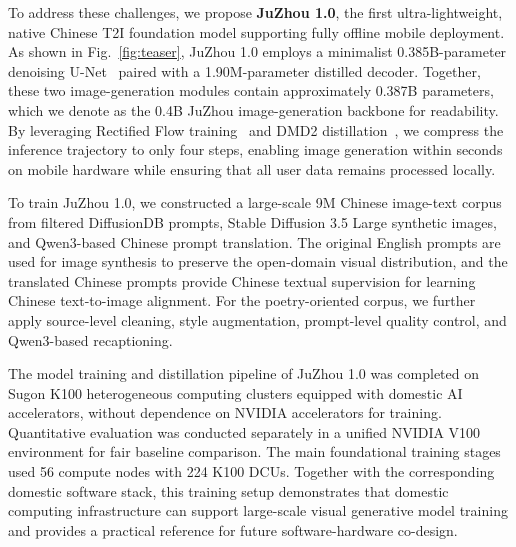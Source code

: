 To address these challenges, we propose \textbf{JuZhou 1.0}, the first ultra-lightweight, native Chinese T2I foundation model supporting fully offline mobile deployment. 
As shown in Fig.~\ref{fig:teaser}, JuZhou 1.0 employs a minimalist 0.385B-parameter denoising U-Net~\cite{ho2020ddpm, rombach2022high} paired with a 1.90M-parameter distilled decoder. Together, these two image-generation modules contain approximately 0.387B parameters, which we denote as the 0.4B JuZhou image-generation backbone for readability.
By leveraging Rectified Flow training~\cite{liu2022flow} and DMD2 distillation~\cite{yin2024improved_dmd}, we compress the inference trajectory to only four steps, enabling image generation within seconds on mobile hardware while ensuring that all user data remains processed locally.

To train JuZhou 1.0, we constructed a large-scale 9M Chinese image-text corpus from filtered DiffusionDB prompts, Stable Diffusion 3.5 Large synthetic images, and Qwen3-based Chinese prompt translation. The original English prompts are used for image synthesis to preserve the open-domain visual distribution, and the translated Chinese prompts provide Chinese textual supervision for learning Chinese text-to-image alignment. For the poetry-oriented corpus, we further apply source-level cleaning, style augmentation, prompt-level quality control, and Qwen3-based recaptioning.

The model training and distillation pipeline of JuZhou 1.0 was completed on Sugon K100 heterogeneous computing clusters equipped with domestic AI accelerators, without dependence on NVIDIA accelerators for training. Quantitative evaluation was conducted separately in a unified NVIDIA V100 environment for fair baseline comparison.
The main foundational training stages used 56 compute nodes with 224 K100 DCUs.
Together with the corresponding domestic software stack, this training setup demonstrates that domestic computing infrastructure can support large-scale visual generative model training and provides a practical reference for future software-hardware co-design.

